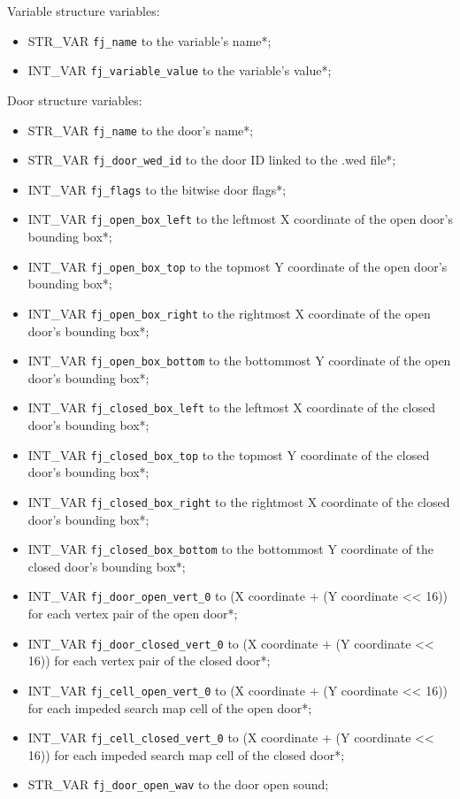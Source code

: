 \documentclass{article}
\begin{document}
Variable structure variables:
\begin{itemize}
\item STR_VAR \verb+fj_name+ to the variable's name*;
\item INT_VAR \verb+fj_variable_value+ to the variable's value*;
\end{itemize}
Door structure variables:
\begin{itemize}
\item STR_VAR \verb+fj_name+ to the door's name*;
\item STR_VAR \verb+fj_door_wed_id+ to the door ID linked to the .wed file*;
\item INT_VAR \verb+fj_flags+ to the bitwise door flags*;
\item INT_VAR \verb+fj_open_box_left+ to the leftmost X coordinate of the open door's bounding box*;
\item INT_VAR \verb+fj_open_box_top+ to the topmost Y coordinate of the open door's bounding box*;
\item INT_VAR \verb+fj_open_box_right+ to the rightmost X coordinate of the open door's bounding box*;
\item INT_VAR \verb+fj_open_box_bottom+ to the bottommost Y coordinate of the open door's bounding box*;
\item INT_VAR \verb+fj_closed_box_left+ to the leftmost X coordinate of the closed door's bounding box*;
\item INT_VAR \verb+fj_closed_box_top+ to the topmost Y coordinate of the closed door's bounding box*;
\item INT_VAR \verb+fj_closed_box_right+ to the rightmost X coordinate of the closed door's bounding box*;
\item INT_VAR \verb+fj_closed_box_bottom+ to the bottommost Y coordinate of the closed door's bounding box*;
\item INT_VAR \verb+fj_door_open_vert_0+ to (X coordinate + (Y coordinate << 16)) for each vertex pair of the open door*;
\item INT_VAR \verb+fj_door_closed_vert_0+ to (X coordinate + (Y coordinate << 16)) for each vertex pair of the closed door*;
\item INT_VAR \verb+fj_cell_open_vert_0+ to (X coordinate + (Y coordinate << 16)) for each impeded search map cell of the open door*;
\item INT_VAR \verb+fj_cell_closed_vert_0+ to (X coordinate + (Y coordinate << 16)) for each impeded search map cell of the closed door*;
\item STR_VAR \verb+fj_door_open_wav+ to the door open sound;

\end{itemize}
\end{document}
